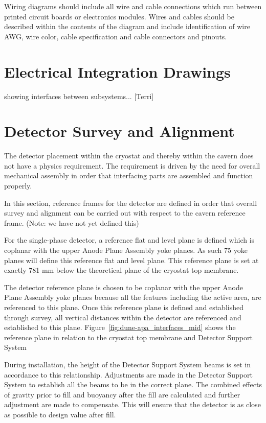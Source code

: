 Wiring diagrams should include all wire and cable connections which
run between printed circuit boards or electronics modules.  Wires and
cables should be described within the contents of the diagram and
include identification of wire AWG, wire color, cable specification
and cable connectors and pinouts.


\section{Electrical Integration Drawings}
\label{sec:fdsp-coord-integ-electrical}
showing interfaces between subsystems... [Terri]


\section{Detector Survey and Alignment}
\label{sec:fdsp-coord-integ-survey}
The detector placement within the cryostat and thereby within the
cavern does not have a physics requirement. The requirement is driven
by the need for overall mechanical assembly in order that interfacing
parts are assembled and function properly.

In this section, reference frames for the detector are defined in order
that overall survey and alignment can be carried out with respect to
the cavern reference frame. (Note: we have not yet defined this)

For the single-phase detector, a reference flat and level plane is
defined which is coplanar with the upper Anode Plane Assembly yoke
planes. As such 75 yoke planes will define this reference flat and
level plane. This reference plane is set at exactly 781 mm below the
theoretical plane of the cryostat top membrane.

The detector reference plane is chosen to be coplanar with the upper
Anode Plane Assembly yoke planes because all the features including the active area, are referenced to this plane.  Once
this reference plane is defined and established through survey, all vertical
distances within the detector are referenced and established to this
plane.  Figure~\ref{fig:dune-apa_interfaces_mid} shows the reference
plane in relation to the cryostat top membrane and Detector Support System

During installation, the height of the Detector Support System beams
is set in accordance to this relationship. Adjustments are made in the
Detector Support System to establish all the beams to be in the
correct plane. The combined effects of gravity prior to fill and
buoyancy after the fill are calculated and further adjustment are made
to compensate. This will ensure that the detector is as close as
possible to design value after fill.


